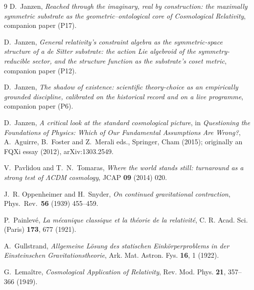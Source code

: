 \documentclass[11pt,a4paper]{article}
\theoremstyle{definition}
\begin{document}
\begin{thebibliography}{9}
D.~Janzen,
\emph{Reached through the imaginary, real by construction: the maximally symmetric substrate as the geometric--ontological core of Cosmological Relativity}, companion paper (P17).

D.~Janzen,
\emph{General relativity's constraint algebra as the symmetric-space structure of a de Sitter substrate: the action Lie algebroid of the symmetry-reducible sector, and the structure function as the substrate's coset metric}, companion paper (P12).

D.~Janzen,
\emph{The shadow of existence: scientific theory-choice as an empirically grounded discipline, calibrated on the historical record and on a live programme}, companion paper (P6).

D.~Janzen,
\emph{A critical look at the standard cosmological picture},
in \emph{Questioning the Foundations of Physics: Which of Our Fundamental Assumptions Are Wrong?}, A.~Aguirre, B.~Foster and Z.~Merali eds., Springer, Cham (2015); originally an FQXi essay (2012), arXiv:1303.2549.

 V.~Pavlidou and T.~N.~Tomaras, \emph{Where the world stands still: turnaround as a strong test of $\Lambda$CDM cosmology}, JCAP \textbf{09} (2014) 020.

J.~R. Oppenheimer and H.~Snyder,
\emph{On continued gravitational contraction},
Phys.~Rev.~\textbf{56} (1939) 455--459.

P.~Painlev\'e,
\emph{La m\'ecanique classique et la th\'eorie de la relativit\'e},
C. R. Acad. Sci. (Paris) \textbf{173}, 677 (1921).

A.~Gullstrand,
\emph{Allgemeine L\"osung des statischen Eink\"orperproblems in der Einsteinschen Gravitationstheorie},
Ark. Mat. Astron. Fys. \textbf{16}, 1 (1922).

G.~Lema\^itre,
\emph{Cosmological Application of Relativity},
Rev. Mod. Phys. \textbf{21}, 357--366 (1949).


\end{thebibliography}
\end{document}
